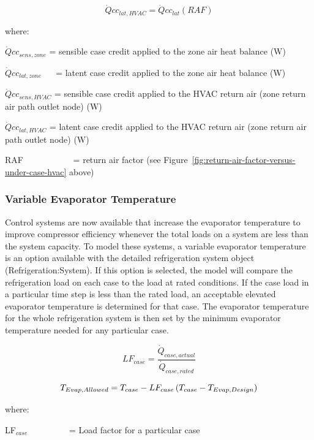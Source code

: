 \begin{equation}
\dot Qc{c_{lat,HVAC}} = \dot Qc{c_{lat}}\left( {RAF} \right)
\end{equation}

where:

\(\dot Qc{c_{sens,zone}}\) = sensible case credit applied to the zone air heat balance (W)

\(\dot Qc{c_{lat,zone}}\) ~~ = latent case credit applied to the zone air heat balance (W)

\(\dot Qc{c_{sens,HVAC}}\) = sensible case credit applied to the HVAC return air (zone return air path outlet node) (W)

\(\dot Qc{c_{lat,HVAC}}\) = latent case credit applied to the HVAC return air (zone return air path outlet node) (W)

RAF~~~~~~~~~~~ = return air factor (see Figure~\ref{fig:return-air-factor-versus-under-case-hvac} above)

\subsubsection{Variable Evaporator Temperature}\label{variable-evaporator-temperature}

Control systems are now available that increase the evaporator temperature to improve compressor efficiency whenever the total loads on a system are less than the system capacity. To model these systems, a variable evaporator temperature is an option available with the detailed refrigeration system object (Refrigeration:System). If this option is selected, the model will compare the refrigeration load on each case to the load at rated conditions. If the case load in a particular time step is less than the rated load, an acceptable elevated evaporator temperature is determined for that case. The evaporator temperature for the whole refrigeration system is then set by the minimum evaporator temperature needed for any particular case.

\begin{equation}
  LF_{case} = \frac{\dot{Q}_{case,actual}}{\dot{Q}_{case,rated}}
\end{equation}

\begin{equation} 
  T_{Evap,Allowed} = T_{case} - LF_{case}\left(T_{case} - T_{Evap,Design}\right)
\end{equation}

where:

LF\(_{case}\)~~~~~~~~~ = Load factor for a particular case

